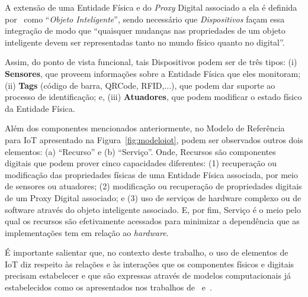 A extensão de uma Entidade Física e do \textit{Proxy} Digital associado a ela é definida por~\cite{serbanati:2011} como ``\textit{Objeto Inteligente}'', sendo necessário que \textit{Dispositivos} façam essa integração de modo que ``quaisquer mudanças nas propriedades de um objeto inteligente devem ser representadas tanto no mundo físico quanto no digital''.

Assim, do ponto de vista funcional, tais Dispositivos podem ser de três tipos: (i) \textbf{Sensores}, que proveem informações sobre a Entidade Física que eles monitoram; (ii) \textbf{Tags} (código de barra, QRCode, RFID,...), que podem dar suporte ao processo de identificação; e, (iii) \textbf{Atuadores}, que podem modificar o estado físico da Entidade Física. 

Além dos componentes mencionados anteriormente, no Modelo de Referência para IoT apresentado na Figura~\ref{fig:modeloiot}, podem ser observados outros dois elementos: (a) ``Recurso'' e (b) ``Serviço''. Onde, Recursos são componentes digitais que podem prover cinco capacidades diferentes: (1) recuperação ou modificação das propriedades físicas de uma Entidade Física associada, por meio de sensores ou atuadores; (2) modificação ou recuperação de propriedades digitais de um Proxy Digital associado; e (3) uso de serviços de hardware complexo ou de software através do objeto inteligente associado. E, por fim, Serviço é o meio pelo qual os recursos são efetivamente acessados para minimizar a dependência que as implementações tem em relação ao  \textit{hardware}.

É importante salientar que, no contexto deste trabalho, o uso de elementos de IoT diz respeito às relações e às interações que os componentes físicos e digitais precisam estabelecer e que são expressas através de modelos computacionais já estabelecidos como os apresentados nos trabalhos de~\cite{Chang:2014} e~\cite{serbanati:2011}.


